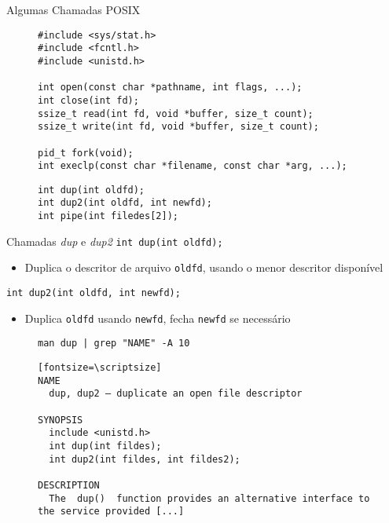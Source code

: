 \documentclass[10pt, compress, aspectratio=169, xcolor={table,usenames,dvipsnames}]{beamer}
\begin{document}
\begin{frame}[label={sec:orgf31e103},fragile]{Algumas Chamadas POSIX}
 \begin{figure}
\begin{minipage}{0.6\textwidth}

\begin{verbatim}
#include <sys/stat.h>
#include <fcntl.h>
#include <unistd.h>

int open(const char *pathname, int flags, ...);
int close(int fd);
ssize_t read(int fd, void *buffer, size_t count);
ssize_t write(int fd, void *buffer, size_t count);

pid_t fork(void);
int execlp(const char *filename, const char *arg, ...);
\end{verbatim}

\pause
\vspace{0.3em}

\begin{verbatim}
int dup(int oldfd);
int dup2(int oldfd, int newfd);
int pipe(int filedes[2]);
\end{verbatim}

\end{minipage}
\end{figure}
\end{frame}

\begin{frame}[label={sec:org55e2001},fragile]{Chamadas \emph{dup} e \emph{dup2}}
 \texttt{int dup(int oldfd);}
\begin{itemize}
\item \alert{Duplica} o descritor de arquivo \texttt{oldfd}, usando o menor descritor disponível
\end{itemize}

\texttt{int dup2(int oldfd, int newfd);}
\begin{itemize}
\item \alert{Duplica} \texttt{oldfd} usando \texttt{newfd}, fecha \texttt{newfd} se necessário
\end{itemize}

\begin{figure}
\begin{minipage}{.95\textwidth}

\begin{verbatim}
man dup | grep "NAME" -A 10
\end{verbatim}

\begin{verbatim}[fontsize=\scriptsize]
NAME
  dup, dup2 — duplicate an open file descriptor

SYNOPSIS
  include <unistd.h>
  int dup(int fildes);
  int dup2(int fildes, int fildes2);

DESCRIPTION
  The  dup()  function provides an alternative interface to the service provided [...]
\end{verbatim}

\end{minipage}
\end{figure}
\end{frame}
\end{document}
